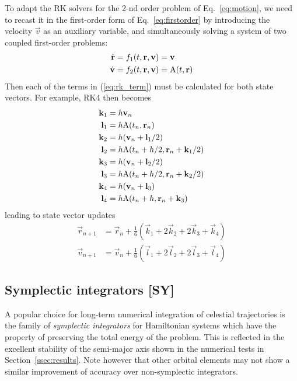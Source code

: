 \documentclass[Orbiter Technical Reference.tex]{subfiles}
\begin{document}
To adapt the RK solvers for the 2-nd order problem of Eq.~\ref{eq:motion}, we need to recast it in the first-order form of Eq.~\ref{eq:firstorder} by introducing the velocity $\vec{v}$ as an auxiliary variable, and simultaneously solving a system of two coupled first-order problems:
\begin{equation*}
\begin{split}
\dot{\mathbf{r}} &= f_1(t,\mathbf{r},\mathbf{v}) = \mathbf{v} \\
\dot{\mathbf{v}} &= f_2(t,\mathbf{r},\mathbf{v}) = \mathrm{A}(t,\mathbf{r})
\end{split}
\end{equation*}
Then each of the terms in (\ref{eq:rk_term}) must be calculated for both state vectors. For example, RK4 then becomes
\begin{equation*}
\begin{split}
\mathbf{k}_1 &= h\mathbf{v}_n \\
\mathbf{l}_1 &= h\mathrm{A}(t_n, \mathbf{r}_n) \\
\mathbf{k}_2 &= h(\mathbf{v}_n+\mathbf{l}_1/2) \\
\mathbf{l}_2 &= h\mathrm{A}(t_n+h/2, \mathbf{r}_n+\mathbf{k}_1/2) \\
\mathbf{k}_3 &= h(\mathbf{v}_n+\mathbf{l}_2/2) \\
\mathbf{l}_3 &= h\mathrm{A}(t_n+h/2, \mathbf{r}_n+\mathbf{k}_2/2) \\
\mathbf{k}_4 &= h(\mathbf{v}_n + \mathbf{l}_3) \\
\mathbf{l}_4 &= h\mathrm{A}(t_n+h, \mathbf{r}_n+\mathbf{k}_3)
\end{split}
\end{equation*}
leading to state vector updates
\begin{equation*}
\begin{split}
\vec{r}_{n+1} &= \vec{r}_n + \frac{1}{6}(\vec{k}_1 + 2\vec{k}_2 + 2\vec{k}_3 + \vec{k}_4) \\
\vec{v}_{n+1} &= \vec{v}_n + \frac{1}{6}(\vec{l}_1 + 2\vec{l}_2 + 2\vec{l}_3 + \vec{l}_4)
\end{split}
\end{equation*}

\subsection{Symplectic integrators [SY]}
A popular choice for long-term numerical integration of celestial trajectories is the family of \emph{symplectic integrators} for Hamiltonian systems which have the property of preserving the total energy of the problem. This is reflected in the excellent stability of the semi-major axis shown in the numerical tests in Section~\ref{ssec:results}. Note however that other orbital elements may not show a similar improvement of accuracy over non-symplectic integrators.
\end{document}
